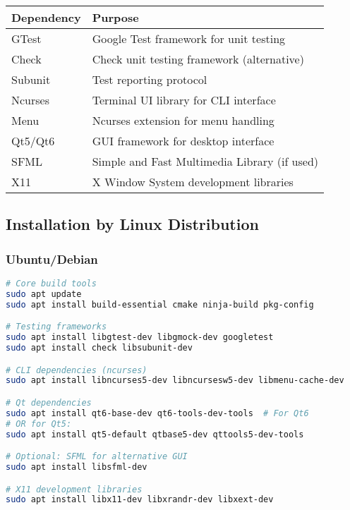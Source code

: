 \documentclass[12pt]{article}
\begin{document}
\begin{tabularx}{\textwidth}{|l|X|}
\hline
\textbf{Dependency} & \textbf{Purpose} \\
\hline
GTest & Google Test framework for unit testing \\
\hline
Check & Check unit testing framework (alternative) \\
\hline
Subunit & Test reporting protocol \\
\hline
Ncurses & Terminal UI library for CLI interface \\
\hline
Menu & Ncurses extension for menu handling \\
\hline
Qt5/Qt6 & GUI framework for desktop interface \\
\hline
SFML & Simple and Fast Multimedia Library (if used) \\
\hline
X11 & X Window System development libraries \\
\hline
\end{tabularx}

\subsection{Installation by Linux Distribution}

\subsubsection{Ubuntu/Debian}
\begin{lstlisting}[language=bash]
# Core build tools
sudo apt update
sudo apt install build-essential cmake ninja-build pkg-config

# Testing frameworks
sudo apt install libgtest-dev libgmock-dev googletest
sudo apt install check libsubunit-dev

# CLI dependencies (ncurses)
sudo apt install libncurses5-dev libncursesw5-dev libmenu-cache-dev

# Qt dependencies
sudo apt install qt6-base-dev qt6-tools-dev-tools  # For Qt6
# OR for Qt5:
sudo apt install qt5-default qtbase5-dev qttools5-dev-tools

# Optional: SFML for alternative GUI
sudo apt install libsfml-dev

# X11 development libraries
sudo apt install libx11-dev libxrandr-dev libxext-dev
\end{lstlisting}
\end{document}
